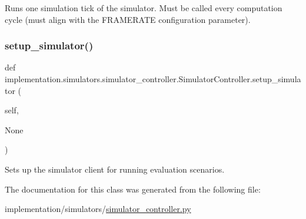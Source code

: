\begin{DoxyVerb}Runs one simulation tick of the simulator. Must be called every computation cycle (must align with the
FRAMERATE configuration parameter).
\end{DoxyVerb}
 \mbox{\label{classimplementation_1_1simulators_1_1simulator__controller_1_1_simulator_controller_a7c2a65ff6436876710a4ca3c9c976d27}} 
\subsubsection{\texorpdfstring{setup\+\_\+simulator()}{setup\_simulator()}}
{\footnotesize\ttfamily def implementation.\+simulators.\+simulator\+\_\+controller.\+Simulator\+Controller.\+setup\+\_\+simulator (\begin{DoxyParamCaption}\item[{}]{self,  }\item[{}]{None }\end{DoxyParamCaption})}

\begin{DoxyVerb}Sets up the simulator client for running evaluation scenarios.\end{DoxyVerb}
 

The documentation for this class was generated from the following file\+:\begin{DoxyCompactItemize}
\item 
implementation/simulators/\hyperlink{simulator__controller_8py}{simulator\+\_\+controller.\+py}\end{DoxyCompactItemize}
